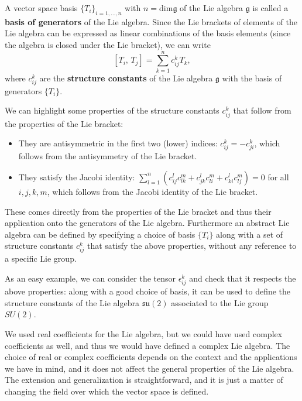 \begin{definition}
    A vector space basis \(\{T_i\}_{i=1,\dots,n}\) with \(n = \text{dim}\mathfrak{g}\) of the Lie algebra \(\mathfrak{g}\) is called a \textbf{basis of generators} of the Lie algebra. Since the Lie brackets of elements of the Lie algebra can be expressed as linear combinations of the basis elements (since the algebra is closed under the Lie bracket), we can write
    \[
        [T_i,\,T_j] = \sum_{k=1}^n c_{ij}^k T_k,
    \]
    where \(c_{ij}^k\) are the \textbf{structure constants} of the Lie algebra \(\mathfrak{g}\) with the basis of generators \(\{T_i\}\).
\end{definition}

We can highlight some properties of the structure constants \(c_{ij}^k\) that follow from the properties of the Lie bracket:
\begin{itemize}
    \item They are antisymmetric in the first two (lower) indices: \(c_{ij}^k = -c_{ji}^k\), which follows from the antisymmetry of the Lie bracket.
    \item They satisfy the Jacobi identity: \(\sum_{l=1}^n (c_{ij}^l c_{lk}^m + c_{jk}^l c_{li}^m + c_{ki}^l c_{lj}^m) = 0\) for all \(i,j,k,m\), which follows from the Jacobi identity of the Lie bracket.
\end{itemize}
These comes directly from the properties of the Lie bracket and thus their application onto the generators of the Lie algebra. Furthermore an abstract Lie algebra can be defined by specifying a choice of basis \(\{T_i\}\) along with a set of structure constants \(c_{ij}^k\) that satisfy the above properties, without any reference to a specific Lie group.

As an easy example, we can consider the tensor \(\epsilon_{ij}^k\) and check that it respects the above properties: along with a good choice of basis, it can be used to define the structure constants of the Lie algebra \(\mathfrak{su}(2)\) associated to the Lie group \(SU(2)\).

We used real coefficients for the Lie algebra, but we could have used complex coefficients as well, and thus we would have defined a complex Lie algebra. The choice of real or complex coefficients depends on the context and the applications we have in mind, and it does not affect the general properties of the Lie algebra. The extension and generalization is straightforward, and it is just a matter of changing the field over which the vector space is defined.

